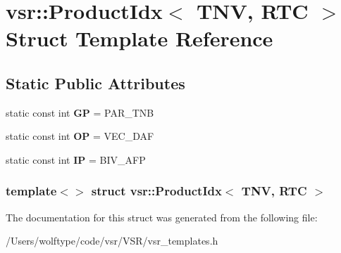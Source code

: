 \hypertarget{structvsr_1_1_product_idx_3_01_t_n_v_00_01_r_t_c_01_4}{\section{vsr\-:\-:Product\-Idx$<$ T\-N\-V, R\-T\-C $>$ Struct Template Reference}
\label{structvsr_1_1_product_idx_3_01_t_n_v_00_01_r_t_c_01_4}
}
\subsection*{Static Public Attributes}
\begin{DoxyCompactItemize}
\item 
\hypertarget{structvsr_1_1_product_idx_3_01_t_n_v_00_01_r_t_c_01_4_ae1ca8b2d5719d306f2bec47309fc1441}{static const int {\bfseries G\-P} = P\-A\-R\-\_\-\-T\-N\-B}\label{structvsr_1_1_product_idx_3_01_t_n_v_00_01_r_t_c_01_4_ae1ca8b2d5719d306f2bec47309fc1441}

\item 
\hypertarget{structvsr_1_1_product_idx_3_01_t_n_v_00_01_r_t_c_01_4_ac32079e8fcd4795d2f20468fe2289df1}{static const int {\bfseries O\-P} = V\-E\-C\-\_\-\-D\-A\-F}\label{structvsr_1_1_product_idx_3_01_t_n_v_00_01_r_t_c_01_4_ac32079e8fcd4795d2f20468fe2289df1}

\item 
\hypertarget{structvsr_1_1_product_idx_3_01_t_n_v_00_01_r_t_c_01_4_a3dd4ffa2ec696bfb26a77bb41513d414}{static const int {\bfseries I\-P} = B\-I\-V\-\_\-\-A\-F\-P}\label{structvsr_1_1_product_idx_3_01_t_n_v_00_01_r_t_c_01_4_a3dd4ffa2ec696bfb26a77bb41513d414}

\end{DoxyCompactItemize}
\subsubsection*{template$<$$>$ struct vsr\-::\-Product\-Idx$<$ T\-N\-V, R\-T\-C $>$}



The documentation for this struct was generated from the following file\-:\begin{DoxyCompactItemize}
\item 
/\-Users/wolftype/code/vsr/\-V\-S\-R/vsr\-\_\-templates.\-h\end{DoxyCompactItemize}
